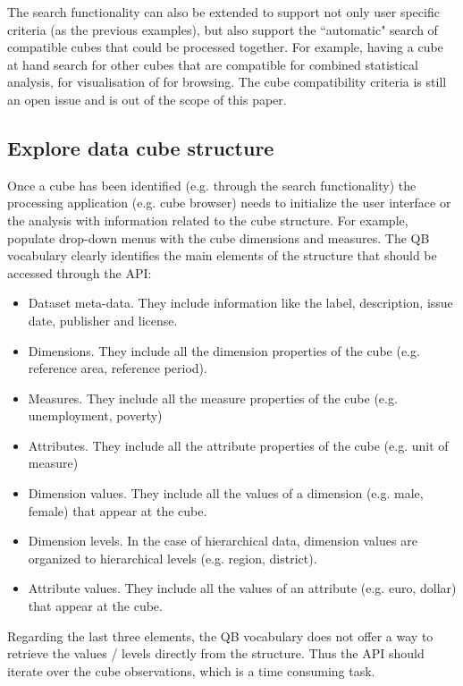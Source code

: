 \documentclass{llncs}
\begin{document}
The search functionality can also be extended to support not only user specific criteria (as the previous examples), but also support the ``automatic" search of compatible cubes that could be processed together. For example, having a cube at hand search for other cubes that are compatible for combined statistical analysis, for visualisation of for browsing. The cube compatibility criteria is still an open issue and is out of the scope of this paper. 

\subsection{Explore data cube structure}

Once a cube has been identified (e.g. through the search functionality) the processing application (e.g. cube browser) needs to initialize the user interface or the analysis with information related to the cube structure. For example, populate drop-down menus with the cube dimensions and measures. The QB vocabulary clearly identifies the main elements of the structure that should be accessed through the API:
\begin{itemize}
\item Dataset meta-data. They include information like the label, description, issue date, publisher and license.
\item Dimensions. They include all the dimension properties of the cube (e.g. reference area, reference period).
\item Measures. They include all the measure properties of the cube (e.g. unemployment, poverty)
\item Attributes. They include all the attribute properties of the cube (e.g. unit of measure)
\item Dimension values. They include all the values of a dimension (e.g. male, female) that appear at the cube. 
\item Dimension levels. In the case of hierarchical data, dimension values are organized to hierarchical levels (e.g. region, district).
\item Attribute values. They include all the values of an attribute (e.g. euro, dollar) that appear at the cube. 
\end{itemize} 

Regarding the last three elements, the QB vocabulary does not offer a way to retrieve the values / levels directly from the structure. Thus the API should iterate over the cube observations, which is a time consuming task.
\end{document}
